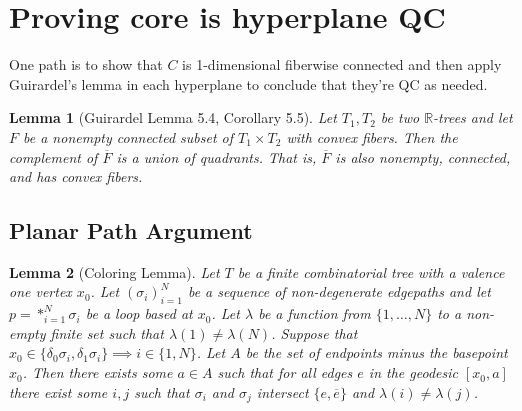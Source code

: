 \documentclass{article}
\theoremstyle{mystyle}
\newtheorem{lem}{Lemma}[section]
\theoremstyle{remark}
\begin{document}
\section{Proving core is hyperplane QC}
One path is to show that \(C\) is 1-dimensional fiberwise connected and then apply Guirardel's lemma in each hyperplane to conclude that they're QC as needed.

\begin{lem}
	[Guirardel Lemma 5.4, Corollary 5.5]
	Let \(T_{1} , T_{2}\) be two \(\mathbb{R}\)-trees and let \(F\) be a nonempty connected subset of \(T_{1} \times T_{2}\) with convex fibers. Then the complement of \(\overline{F}\) is a union of quadrants. That is, \(\overline{F}\) is also nonempty, connected, and has convex fibers.
\end{lem}
\subsection{Planar Path Argument}
\begin{lem}[Coloring Lemma]%
	Let \(T\) be a finite combinatorial tree with a valence one vertex \(x_{0}\). Let \((\sigma_{i} )_{i=1}^{N}\) be a sequence of non-degenerate edgepaths and let \(p = *_{i=1}^{N} \sigma_{i}\) be a loop based at \(x_{0}\). Let \(\lambda\) be a function from \(\{1,\ldots,N\}\) to a non-empty finite set such that \(\lambda (1) \neq \lambda (N)\). Suppose that \(x_{0} \in \{\delta_{0} \sigma_{i} , \delta_{1} \sigma_{i} \} \implies i \in \{1,N\}\). Let \(A\) be the set of endpoints minus the basepoint \(x_{ 0}\). Then there exists some \(a \in A\) such that for all edges \(e\) in the geodesic \([x_{0} , a]\) there exist some \(i, j\) such that \(\sigma_{i}\) and \(\sigma_{j}\) intersect \(\{e,\overline{e}\}\) and \(\lambda ( i ) \neq \lambda ( j )\).
\end{lem}%
\end{document}
